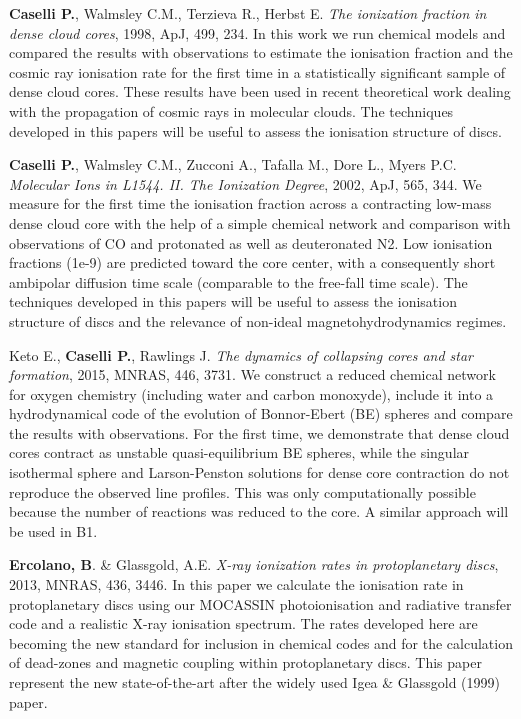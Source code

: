 \documentclass[10pt,fleqn,twoside]{article}
\begin{document}
\begin{literature}

\item \textbf{Caselli P.}, Walmsley C.M., Terzieva R., Herbst
  E. \textit{The ionization fraction in dense cloud cores}, 1998, ApJ,
  499, 234. In this work we run chemical models and compared the
  results with observations to estimate the ionisation fraction and
  the cosmic ray ionisation rate for the first time in a statistically
  significant sample of dense cloud cores. These results have been
  used in recent theoretical work dealing with the propagation of
  cosmic rays in molecular clouds. The techniques developed in this
  papers will be useful to assess the ionisation structure of discs.

\item \textbf{Caselli P.}, Walmsley C.M., Zucconi A., Tafalla M.,
  Dore L., Myers P.C. \textit{Molecular Ions in L1544. II. The
    Ionization Degree}, 2002, ApJ, 565, 344. We measure for the first
  time the ionisation fraction across a contracting low-mass dense
  cloud core with the help of a simple chemical network and comparison
  with observations of CO and protonated as well as deuteronated
  N2. Low ionisation fractions (1e-9) are predicted toward the core
  center, with a consequently short ambipolar diffusion time scale
  (comparable to the free-fall time scale). The techniques developed in this
  papers will be useful to assess the ionisation structure of discs
  and the relevance of non-ideal magnetohydrodynamics regimes. 

 \item Keto E., \textbf{Caselli P.}, Rawlings J. \textit{The dynamics
     of collapsing cores and star formation}, 2015, MNRAS, 446,
   3731. We construct a reduced chemical network for oxygen chemistry
   (including water and carbon monoxyde), include it into a
   hydrodynamical code of the evolution of Bonnor-Ebert (BE) spheres
   and compare the results with observations.  For the first time, we
   demonstrate that dense cloud cores contract as unstable
   quasi-equilibrium BE spheres, while the singular isothermal sphere
   and Larson-Penston solutions for dense core contraction do not
   reproduce the observed line profiles.  This was only
   computationally possible
   because the number of reactions was reduced to the core. A similar
   approach will be used in B1. 

\item \textbf{Ercolano, B}. \& Glassgold, A.E. {\em X-ray ionization rates in
    protoplanetary discs}, 2013, MNRAS, 436, 3446. In this paper we
  calculate the ionisation rate in protoplanetary discs using our
  MOCASSIN photoionisation and radiative transfer code and a realistic
  X-ray ionisation spectrum. The rates
  developed here are becoming the new standard for inclusion in
  chemical codes and for the calculation of dead-zones and magnetic
  coupling within protoplanetary discs. This paper represent the new
  state-of-the-art after the widely used Igea \& Glassgold (1999)
  paper. 


\end{literature}
\end{document}
